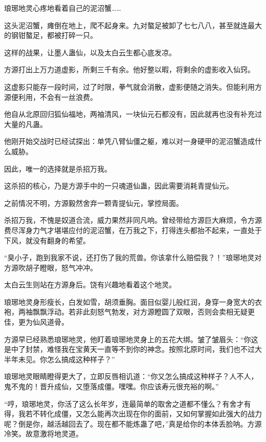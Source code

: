 
\begin{this_body}

琅琊地灵心疼地看着自己的泥沼蟹……

这头泥沼蟹，瘫倒在地上，爬不起身来。九对螯足被卸了七七八八，甚至就连最大的钢钳螯足，都被打碎一只。

这样的战果，让墨人蛊仙，以及太白云生都心底发凉。

方源打出上万力道虚影，所剩三千有余。他好整以暇，将剩余的虚影收入仙窍。

这虚影只能存一段时间，过了时限，拳气就会消散，虚影便随之消失。但能利用方源便利用，不会有一丝浪费。

他自从北原回归狐仙福地，两袖清风，一块仙元石都没有，因此就再也没有补充过大量的凡蛊。

他刚开始交战时已经试探出：单凭八臂仙僵之躯，难以对一身硬甲的泥沼蟹造成什么威胁。

因此，唯一的选择就是杀招万我。

这杀招的核心，乃是方源手中的一只魂道仙蛊，因此需要消耗青提仙元。

之前情况不明，方源毅然舍弃一颗青提仙元，掌控局面。

杀招万我，不愧是奴道合流，威力果然非同凡响。曾经带给方源巨大麻烦，令方源费尽浑身力气才堪堪应付的泥沼蟹，在万我之下，打得连头都抬不起来，一直处于下风，就没有翻身的希望。

“臭小子，跑到我家不说，还打伤了我的荒兽。你该拿什么赔偿我？！”琅琊地灵对方源吹胡子瞪眼，怒气冲冲。

太白云生则站在方源身后。饶有兴趣地看着这个地灵。

琅琊地灵身形瘦长，白发如雪，胡须垂胸。面目似婴儿般红润，身穿一身宽大的衣袍，两袖飘飘浮动。若非此刻怒气勃发，对方源瞪圆了双眼，否则会卖相无疑更佳，更为仙风道骨。

方源早已经熟悉琅琊地灵，他盯着琅琊地灵身上的五花大绑。皱了皱眉头：“你这是中了封禁，难怪我在宝黄天一直等不到你的神念。按照北原时间，我们也不过大半年未见。你怎么搞成这种样子？”

琅琊地灵眼睛瞪得更大了，立即反唇相讥道：“你又怎么搞成这种样子？人不人，鬼不鬼的！晋升成仙，又堕落成僵。嘿嘿。你应该寿元很充裕的啊。”

“哼，琅琊地灵，你活了这么长年岁，连最简单的取舍之道都不懂么？有舍才有得，我若不转化成僵，又怎么能再次出现在你的面前，又如何掌握如此强大的战力呢？倒是你，越活越回去了。现在都不能炼蛊了吧，”真是给你的本体丢脸呐。方源冷笑。故意激将地灵道。


\end{this_body}
